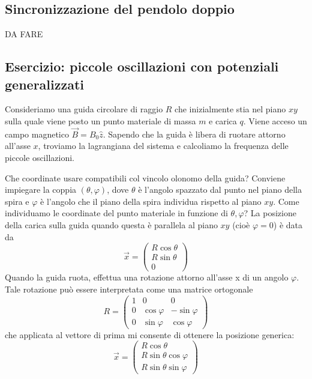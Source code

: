 \documentclass[a4paper,openany]{article}
\begin{document}
	\subsection{Sincronizzazione del pendolo doppio}
	DA FARE
	\subsection{Esercizio: piccole oscillazioni con potenziali generalizzati}
	Consideriamo una guida circolare di raggio $R$ che inizialmente stia nel piano $xy$ sulla quale viene posto un punto materiale di massa $m$ e carica $q$. Viene acceso un campo magnetico $\vec{B} = B_0\hat{z}$. Sapendo che la guida è libera di ruotare attorno all'asse $x$, troviamo la lagrangiana del sistema e calcoliamo la frequenza delle piccole oscillazioni. 
	
	Che coordinate usare compatibili col vincolo olonomo della guida? Conviene impiegare la coppia $(\theta,\varphi)$, dove $\theta$ è l'angolo spazzato dal punto nel piano della spira e $\varphi$ è l'angolo che il piano della spira individua rispetto al piano $xy$. Come individuamo le coordinate del punto materiale in funzione di $\theta, \varphi$? La posizione della carica sulla guida quando questa è parallela al piano $xy$ (cioè $\varphi = 0$) è data da
	\begin{equation}\label{key}
		\vec{x} = 
		\begin{pmatrix}
			R\cos\theta
			\\
			R\sin\theta
			\\0
		\end{pmatrix}
	\end{equation}
	Quando la guida ruota, effettua una rotazione attorno all'asse x di un angolo $\varphi$. Tale rotazione può essere interpretata come una matrice ortogonale
	\begin{equation}\label{key}
		R =
		\begin{pmatrix}
			1 & 0 & 0\\
			0 & \cos\varphi & -\sin\varphi \\
			0 & \sin\varphi & \cos\varphi
		\end{pmatrix}
	\end{equation}
	che applicata al vettore di prima mi consente di ottenere la posizione generica:
	\begin{equation}\label{key}
		\vec{x} = 
		\begin{pmatrix}
			R\cos\theta
			\\
			R\sin\theta\cos\varphi
			\\
			R\sin\theta\sin\varphi
		\end{pmatrix}
	\end{equation}
\end{document}
